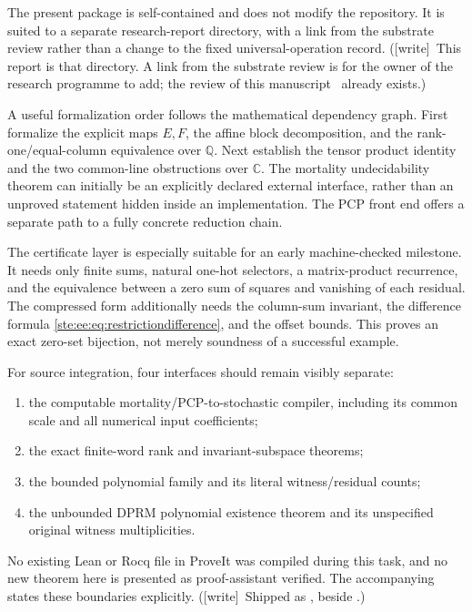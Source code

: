 \documentclass[11pt,letterpaper]{article}
\theoremstyle{definition}
\theoremstyle{remark}
\newcommand{\Q}{\mathbb Q}
\newcommand{\C}{\mathbb C}
\newcommand{\wtag}{\textup{[write]}}
\begin{document}
The present package is self-contained and does not modify the repository. It is
suited to a separate research-report directory, with a link from the substrate
review rather than a change to the fixed universal-operation record.
(\wtag\ This report is that directory. A link from the substrate review is for the owner of the research programme to add; the review of this manuscript~\cite{review1977} already exists.)

A useful formalization order follows the mathematical dependency graph. First
formalize the explicit maps $E,F$, the affine block decomposition, and the
rank-one/equal-column equivalence over $\Q$. Next establish the tensor product
identity and the two common-line obstructions over $\C$. The mortality
undecidability theorem can initially be an explicitly declared external
interface, rather than an unproved statement hidden inside an implementation.
The PCP front end offers a separate path to a fully concrete reduction chain.

The certificate layer is especially suitable for an early machine-checked
milestone. It needs only finite sums, natural one-hot selectors, a matrix-product
recurrence, and the equivalence between a zero sum of squares and vanishing of
each residual. The compressed form additionally needs the column-sum invariant,
the difference formula \eqref{ste:ee:eq:restrictiondifference}, and the offset bounds.
This proves an exact zero-set bijection, not merely soundness of a successful
example.

For source integration, four interfaces should remain visibly separate:
\begin{enumerate}
\item the computable mortality/PCP-to-stochastic compiler, including its common
scale and all numerical input coefficients;
\item the exact finite-word rank and invariant-subspace theorems;
\item the bounded polynomial family and its literal witness/residual counts;
\item the unbounded DPRM polynomial existence theorem and its unspecified
original witness multiplicities.
\end{enumerate}
No existing Lean or Rocq file in ProveIt was compiled during this task, and no
new theorem here is presented as proof-assistant verified. The accompanying
 states these boundaries explicitly. (\wtag\ Shipped as , beside .)
\end{document}
